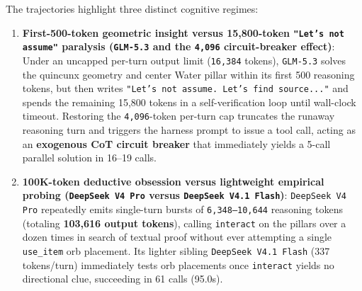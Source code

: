 \documentclass[11pt,a4paper]{article}
\begin{document}
The trajectories highlight three distinct cognitive regimes:
\begin{enumerate}
\item \textbf{First-500-token geometric insight versus 15,800-token \texttt{"Let's\allowbreak{} \allowbreak{}not\allowbreak{} \allowbreak{}assume"} paralysis (\texttt{GLM\allowbreak{}-\allowbreak{}5\allowbreak{}.\allowbreak{}3} and the \texttt{4\allowbreak{},\allowbreak{}096} circuit-breaker effect)}: Under an uncapped per-turn output limit (\texttt{16\allowbreak{},\allowbreak{}384} tokens), \texttt{GLM\allowbreak{}-\allowbreak{}5\allowbreak{}.\allowbreak{}3} solves the quincunx geometry and center Water pillar within its first 500 reasoning tokens, but then writes \texttt{"Let's\allowbreak{} \allowbreak{}not\allowbreak{} \allowbreak{}assume\allowbreak{}.\allowbreak{} \allowbreak{}Let's\allowbreak{} \allowbreak{}find\allowbreak{} \allowbreak{}source\allowbreak{}.\allowbreak{}.\allowbreak{}.\allowbreak{}"} and spends the remaining 15,800 tokens in a self-verification loop until wall-clock timeout. Restoring the \texttt{4\allowbreak{},\allowbreak{}096}-token per-turn cap truncates the runaway reasoning turn and triggers the harness prompt to issue a tool call, acting as an \textbf{exogenous CoT circuit breaker} that immediately yields a 5-call parallel solution in 16--19 calls.
\item \textbf{100K-token deductive obsession versus lightweight empirical probing (\texttt{DeepSeek\allowbreak{} \allowbreak{}V4\allowbreak{} \allowbreak{}Pro} versus \texttt{DeepSeek\allowbreak{} \allowbreak{}V4\allowbreak{}.\allowbreak{}1\allowbreak{} \allowbreak{}Flash})}: \texttt{DeepSeek\allowbreak{} \allowbreak{}V4\allowbreak{} \allowbreak{}Pro} repeatedly emits single-turn bursts of \texttt{6\allowbreak{},\allowbreak{}348--10\allowbreak{},\allowbreak{}644} reasoning tokens (totaling \textbf{103,616 output tokens}), calling \texttt{interact} on the pillars over a dozen times in search of textual proof without ever attempting a single \texttt{use\allowbreak{}\_\allowbreak{}item} orb placement. Its lighter sibling \texttt{DeepSeek\allowbreak{} \allowbreak{}V4\allowbreak{}.\allowbreak{}1\allowbreak{} \allowbreak{}Flash} (337 tokens/turn) immediately tests orb placements once \texttt{interact} yields no directional clue, succeeding in 61 calls (95.0s).

\end{enumerate}
\end{document}
